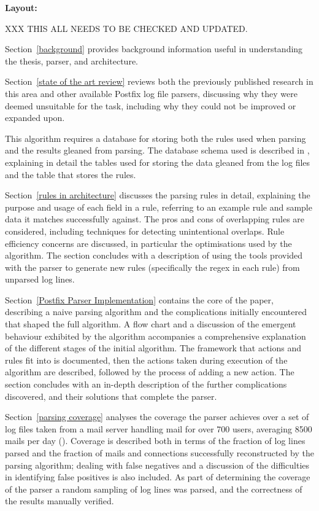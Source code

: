 \vspace{1em}\noindent\textbf{Layout:}

XXX THIS ALL NEEDS TO BE CHECKED AND UPDATED\@.

Section~\ref{background} provides background information useful in
understanding the thesis, parser, and architecture.

Section~\ref{state of the art review} reviews both the previously published
research in this area and other available Postfix log file parsers,
discussing why they were deemed unsuitable for the task, including why they
could not be improved or expanded upon.

This algorithm requires a database for storing both the rules used when
parsing and the results gleaned from parsing.  The database schema used is
described in , explaining in detail the tables
used for storing the data gleaned from the log files and the table that
stores the rules.

Section~\ref{rules in architecture} discusses the parsing rules in detail,
explaining the purpose and usage of each field in a rule, referring to an
example rule and sample data it matches successfully against.  The pros and
cons of overlapping rules are considered, including techniques for
detecting unintentional overlaps.  Rule efficiency concerns are discussed,
in particular the optimisations used by the algorithm.  The section
concludes with a description of using the tools provided with the parser to
generate new rules (specifically the regex in each rule) from unparsed log
lines.

Section~\ref{Postfix Parser Implementation} contains the core of the paper,
describing a naive parsing algorithm and the complications initially
encountered that shaped the full algorithm.  A flow chart and a discussion
of the emergent behaviour exhibited by the algorithm accompanies a
comprehensive explanation of the different stages of the initial algorithm.
The framework that actions and rules fit into is documented, then the
actions taken during execution of the algorithm are described, followed by
the process of adding a new action.  The section concludes with an in-depth
description of the further complications discovered, and their solutions
that complete the parser.

Section~\ref{parsing coverage} analyses the coverage the parser achieves
over a set of \numberOFlogFILES{} log files taken from a mail server
handling mail for over 700 users, averaging 8500 mails per day
().  Coverage is described both
in terms of the fraction of log lines parsed and the fraction of mails and
connections successfully reconstructed by the parsing algorithm; dealing
with false negatives and a discussion of the difficulties in identifying
false positives is also included.  As part of determining the coverage of
the parser a random sampling of log lines was parsed, and the correctness
of the results manually verified.

